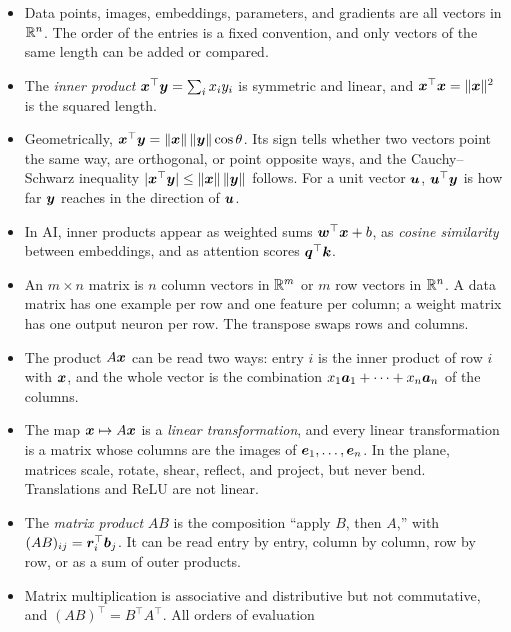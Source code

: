 \begin{itemize}
  \item Data points, images, embeddings, parameters, and gradients are all
    vectors in $\mathbb{R}^n$. The order of the entries is a fixed convention, and
    only vectors of the same length can be added or compared.
  \item The \emph{inner product} $\bm{x}^\top \bm{y} = \sum_i x_i y_i$
    is symmetric and linear, and $\bm{x}^\top \bm{x} =
    \|\bm{x}\|^2$ is the squared length.
  \item Geometrically, $\bm{x}^\top \bm{y} = \|\bm{x}\| \,
    \|\bm{y}\| \cos \theta$. Its sign tells whether two vectors point
    the same way, are orthogonal, or point opposite ways, and the
    Cauchy--Schwarz inequality $|\bm{x}^\top \bm{y}| \le \|\bm{x}\|
    \, \|\bm{y}\|$ follows. For a unit vector $\bm{u}$,
    $\bm{u}^\top \bm{y}$ is how far $\bm{y}$ reaches in the
    direction of $\bm{u}$.
  \item In AI, inner products appear as weighted sums $\bm{w}^\top
    \bm{x} + b$, as \emph{cosine similarity} between embeddings, and as
    attention scores $\bm{q}^\top \bm{k}$.
  \item An $m \times n$ matrix is $n$ column vectors in $\mathbb{R}^m$ or $m$ row
    vectors in $\mathbb{R}^n$. A data matrix has one example per row and one
    feature per column; a weight matrix has one output neuron per row.
    The transpose swaps rows and columns.
  \item The product $A\bm{x}$ can be read two ways: entry $i$ is the
    inner product of row $i$ with $\bm{x}$, and the whole vector is the
    combination $x_1 \bm{a}_1 + \dots + x_n \bm{a}_n$ of the columns.
  \item The map $\bm{x} \mapsto A\bm{x}$ is a \emph{linear
    transformation}, and every linear transformation is a matrix whose
    columns are the images of $\bm{e}_1, \dots, \bm{e}_n$. In the
    plane, matrices scale, rotate, shear, reflect, and project, but never
    bend. Translations and ReLU are not linear.
  \item The \emph{matrix product} $AB$ is the composition ``apply $B$,
    then $A$,'' with $(AB)_{ij} = \bm{r}_i^\top \bm{b}_j$. It can be
    read entry by entry, column by column, row by row, or as a sum of
    outer products.
  \item Matrix multiplication is associative and distributive but not
    commutative, and $(AB)^\top = B^\top A^\top$. All orders of evaluation

\end{itemize}
